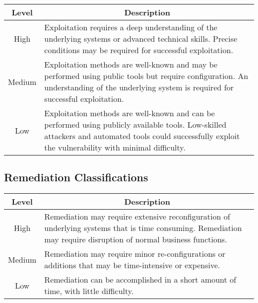 \begin{fullwidth}
\begin{table}[htp]
\centering
\begin{tabular}{|c|p{5.77in}|}
\hline
\rowcolor[HTML]{C0C0C0} 
\textbf{Level} & \multicolumn{1}{c|}{\cellcolor[HTML]{C0C0C0}\textbf{Description}} \\ \hline
\cellcolor[HTML]{\highColor}High &
  Exploitation requires a deep understanding of the underlying systems or advanced technical skills. Precise conditions may be required for successful exploitation. \\ \hline
\cellcolor[HTML]{\medColor}Medium &
  Exploitation methods are well-known and may be performed using public tools but require configuration. An understanding of the underlying system is required for successful exploitation. \\ \hline
\cellcolor[HTML]{\lowColor}Low &
  Exploitation methods are well-known and can be performed using publicly available tools. Low-skilled attackers and automated tools could successfully exploit the vulnerability with minimal difficulty. \\ \hline
\end{tabular}
\end{table}

\newpage
\subsection*{Remediation Classifications}

\begin{table}[htp]
\centering
\begin{tabular}{|c|p{5.77in}|}
\hline
\rowcolor[HTML]{C0C0C0} 
\textbf{Level}                          & \multicolumn{1}{c|}{\cellcolor[HTML]{C0C0C0}\textbf{Description}}                                             \\ \hline
\cellcolor[HTML]{\highColor}High &
  Remediation may require extensive reconfiguration of underlying systems that is time consuming. Remediation may require disruption of normal business functions. \\ \hline
\cellcolor[HTML]{\medColor}Medium & Remediation may require minor re-configurations or additions that may be time-intensive or expensive. \\ \hline
\cellcolor[HTML]{\lowColor}Low    & Remediation can be accomplished in a short amount of time, with little difficulty.                   \\ \hline
\end{tabular}
\end{table}

\end{fullwidth}
\newpage
